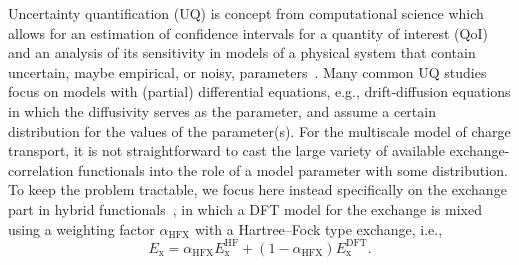 \documentclass[%
 reprint,
superscriptaddress,
 amsmath,amssymb,
 aps,
prb,
floatfix
]{revtex4-2}
\begin{document}
Uncertainty quantification (UQ) is concept from computational science which allows for an estimation of confidence intervals for a quantity of interest (QoI) and an analysis of its sensitivity in models of a physical system that contain uncertain, maybe empirical, or noisy, parameters~\cite{sarkar_uncertainty_2017,oconnor_quantifying_2024, chernatynskiy_uncertainty_2013, suleimenova_tutorial_2021,coveney_reliability_2021, coveney_when_2021}. Many common UQ studies focus on models with (partial) differential equations, e.g., drift-diffusion equations in which the diffusivity serves as the parameter, and assume a certain distribution for the values of the parameter(s). For the multiscale model of charge transport, it is not straightforward to cast the large variety of available exchange-correlation functionals into the role of a model parameter with some distribution. To keep the problem tractable, we focus here instead specifically on the exchange part in hybrid functionals~\cite{perdew_rationale_1996,marques_densitybased_2011}, in which a DFT model for the exchange is mixed using a weighting factor $\alpha_\text{HFX}$ with a Hartree--Fock type exchange, i.e.,
%
\begin{equation}
  E_\text{x} = \alpha_\text{HFX} E_\text{x}^\text{HF} + (1-\alpha_\text{HFX})E_\text{x}^\text{DFT}.
  \label{equ:hybrid}
\end{equation}
%
\end{document}
